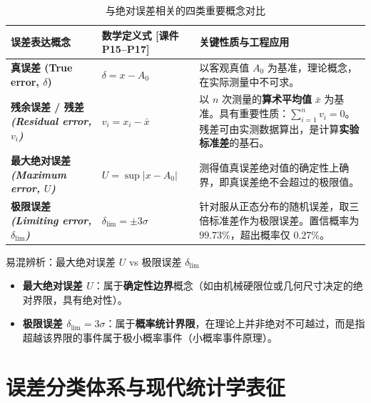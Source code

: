 \documentclass[11pt,a4paper]{ctexart}
\begin{document}
\begin{table}[htbp]
\centering
\small
\renewcommand{\arraystretch}{1.3}
\begin{tabularx}{\textwidth}{p{3.2cm}p{4.5cm}X}
\toprule
\textbf{误差表达概念} & \textbf{数学定义式 [课件 P15--P17]} & \textbf{关键性质与工程应用} \\
\midrule
\textbf{真误差 (True error, $\delta$)} & $\delta = x - A_0$ & 以客观真值 $A_0$ 为基准，理论概念，在实际测量中不可求。 \\
\midrule
\textbf{残余误差 / 残差\newline\textit{(Residual error, $v_i$)}} & $v_i = x_i - \bar{x}$ & 以 $n$ 次测量的\textbf{算术平均值} $\bar{x}$ 为基准。具有重要性质：$\sum_{i=1}^n v_i = 0$。残差可由实测数据算出，是计算\textbf{实验标准差}的基石。 \\
\midrule
\textbf{最大绝对误差\newline\textit{(Maximum error, $U$)}} & $U = \sup |x - A_0|$ & 测得值真误差绝对值的确定性上确界，即真误差绝不会超过的极限值。 \\
\midrule
\textbf{极限误差\newline\textit{(Limiting error, $\delta_{\lim}$)}} & $\delta_{\lim} = \pm 3\sigma$ & 针对服从正态分布的随机误差，取三倍标准差作为极限误差。置信概率为 $99.73\%$，超出概率仅 $0.27\%$。 \\
\bottomrule
\end{tabularx}
\caption{与绝对误差相关的四类重要概念对比}
\end{table}

\begin{tipbox}{易混辨析：最大绝对误差 $U$ vs 极限误差 $\delta_{\lim}$}
\begin{itemize}
    \item \textbf{最大绝对误差 $U$}：属于\textbf{确定性边界}概念（如由机械硬限位或几何尺寸决定的绝对界限，具有绝对性）。
    \item \textbf{极限误差 $\delta_{\lim} = 3\sigma$}：属于\textbf{概率统计界限}，在理论上并非绝对不可越过，而是指超越该界限的事件属于极小概率事件（小概率事件原理）。
\end{itemize}
\end{tipbox}

\section{误差分类体系与现代统计学表征}
\end{document}
